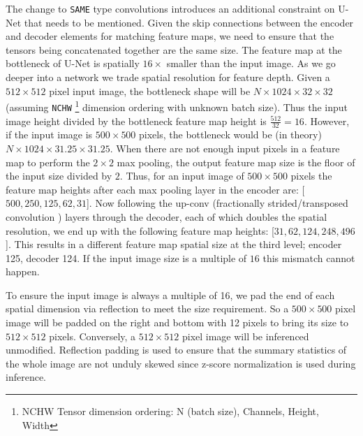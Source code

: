 \documentclass[letterpaper]{article} %
\begin{document}
The change to \texttt{SAME} type convolutions introduces an additional constraint on U-Net that needs to be mentioned. Given the skip connections between the encoder and decoder elements for matching feature maps, we need to ensure that the tensors being concatenated together are the same size. The feature map at the bottleneck of U-Net is spatially $16 \times$ smaller than the input image. 
As we go deeper into a network we trade spatial resolution for feature depth. Given a $512 \times 512$ pixel input image, the bottleneck shape will be $N \times 1024 \times 32 \times 32$ (assuming \texttt{NCHW} \footnote{NCHW Tensor dimension ordering: N (batch size), Channels, Height, Width} dimension ordering with unknown batch size). Thus the input image height divided by the bottleneck feature map height is $\frac{512}{32} = 16$. However, if the input image is $500 \times 500$ pixels, the bottleneck would be (in theory) $N \times 1024 \times 31.25 \times 31.25$. When there are not enough input pixels in a feature map to perform the $2 \times 2$ max pooling, the output feature map size is the floor of the input size divided by $2$. 
Thus, for an input image of $500 \times 500$ pixels the feature map heights after each max pooling layer in the encoder are: [$500, 250, 125, 62, 31$]. Now following the up-conv (fractionally strided/transposed convolution \cite{Dumoulin2018}) layers through the decoder, each of which doubles the spatial resolution, we end up with the following feature map heights: [$31, 62, 124, 248, 496$]. This results in a different feature map spatial size at the third level; encoder 125, decoder 124. If the input image size is a multiple of $16$ this mismatch cannot happen. 

To ensure the input image is always a multiple of 16, we pad the end of each spatial dimension via reflection to meet the size requirement. So a $500 \times 500$ pixel image will be padded on the right and bottom with 12 pixels to bring its size to $512 \times 512$ pixels. Conversely, a $512 \times 512$ pixel image will be inferenced unmodified. Reflection padding is used to ensure that the summary statistics of the whole image are not unduly skewed since z-score normalization is used during inference. 
\end{document}
